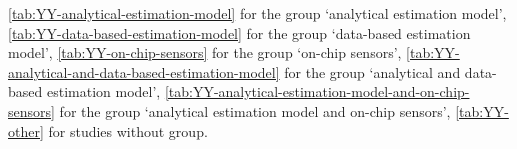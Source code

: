 \ref{tab:YY-analytical-estimation-model} for the group `analytical estimation model', \ref{tab:YY-data-based-estimation-model} for the group `data-based estimation model', \ref{tab:YY-on-chip-sensors} for the group `on-chip sensors', \ref{tab:YY-analytical-and-data-based-estimation-model} for the group `analytical and data-based estimation model', \ref{tab:YY-analytical-estimation-model-and-on-chip-sensors} for the group `analytical estimation model and on-chip sensors', \ref{tab:YY-other} for studies without group.%